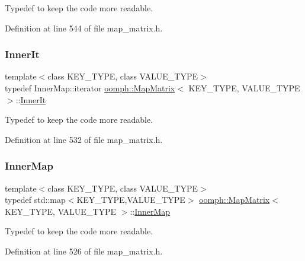 Typedef to keep the code more readable. 



Definition at line 544 of file map\+\_\+matrix.\+h.

\mbox{\label{classoomph_1_1MapMatrix_a23ece77bd36f3cdecf83c5ef7d490608}} 
\subsubsection{\texorpdfstring{Inner\+It}{InnerIt}}
{\footnotesize\ttfamily template$<$class K\+E\+Y\+\_\+\+T\+Y\+PE, class V\+A\+L\+U\+E\+\_\+\+T\+Y\+PE$>$ \\
typedef Inner\+Map\+::iterator \hyperlink{classoomph_1_1MapMatrix}{oomph\+::\+Map\+Matrix}$<$ K\+E\+Y\+\_\+\+T\+Y\+PE, V\+A\+L\+U\+E\+\_\+\+T\+Y\+PE $>$\+::\hyperlink{classoomph_1_1MapMatrix_a23ece77bd36f3cdecf83c5ef7d490608}{Inner\+It}}



Typedef to keep the code more readable. 



Definition at line 532 of file map\+\_\+matrix.\+h.

\mbox{\label{classoomph_1_1MapMatrix_a9514409eb8ed5c6c3f3ceaa3d51e7eae}} 
\subsubsection{\texorpdfstring{Inner\+Map}{InnerMap}}
{\footnotesize\ttfamily template$<$class K\+E\+Y\+\_\+\+T\+Y\+PE, class V\+A\+L\+U\+E\+\_\+\+T\+Y\+PE$>$ \\
typedef std\+::map$<$K\+E\+Y\+\_\+\+T\+Y\+PE,V\+A\+L\+U\+E\+\_\+\+T\+Y\+PE$>$ \hyperlink{classoomph_1_1MapMatrix}{oomph\+::\+Map\+Matrix}$<$ K\+E\+Y\+\_\+\+T\+Y\+PE, V\+A\+L\+U\+E\+\_\+\+T\+Y\+PE $>$\+::\hyperlink{classoomph_1_1MapMatrix_a9514409eb8ed5c6c3f3ceaa3d51e7eae}{Inner\+Map}}



Typedef to keep the code more readable. 



Definition at line 526 of file map\+\_\+matrix.\+h.

